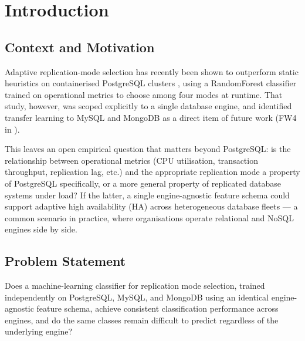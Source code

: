\documentclass[pdflatex,sn-mathphys-num]{sn-jnl}
\theoremstyle{thmstyleone}
\theoremstyle{thmstylethree}
\begin{document}

\maketitle

\section{Introduction}\label{sec:intro}

\subsection{Context and Motivation}\label{subsec:context}

Adaptive replication-mode selection has recently been shown to
outperform static heuristics on containerised PostgreSQL clusters
\cite{iaha2026}, using a RandomForest classifier trained on operational
metrics to choose among four modes at runtime. That study, however,
was scoped explicitly to a single database engine, and identified
transfer learning to MySQL and MongoDB as a direct item of future
work (FW4 in \cite{iaha2026}).

This leaves an open empirical question that matters beyond PostgreSQL:
is the relationship between operational metrics (CPU utilisation,
transaction throughput, replication lag, etc.) and the appropriate
replication mode a property of PostgreSQL specifically, or a more
general property of replicated database systems under load? If the
latter, a single engine-agnostic feature schema could support adaptive
high availability (HA) across heterogeneous database fleets --- a
common scenario in practice, where organisations operate relational
and NoSQL engines side by side.

\subsection{Problem Statement}\label{subsec:problem}

Does a machine-learning classifier for replication mode
selection, trained independently on PostgreSQL, MySQL, and MongoDB
using an identical engine-agnostic feature schema, achieve consistent
classification performance across engines, and do the same classes
remain difficult to predict regardless of the underlying engine?
\end{document}
